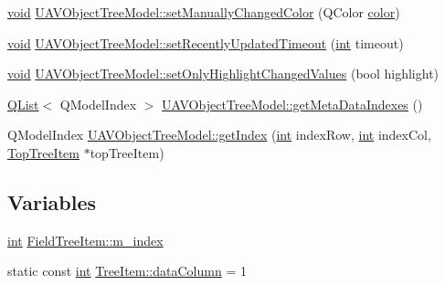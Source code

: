 \begin{DoxyCompactItemize}
\item 
\hyperlink{group___u_a_v_objects_plugin_ga444cf2ff3f0ecbe028adce838d373f5c}{void} \hyperlink{group___u_a_v_object_browser_plugin_ga9bc5e49ee3b742c3f1b9ff05b71f7d7e}{U\-A\-V\-Object\-Tree\-Model\-::set\-Manually\-Changed\-Color} (Q\-Color \hyperlink{glext_8h_a3ea846f998d64f079b86052b6c4193a8}{color})
\item 
\hyperlink{group___u_a_v_objects_plugin_ga444cf2ff3f0ecbe028adce838d373f5c}{void} \hyperlink{group___u_a_v_object_browser_plugin_ga2b730043ef2a9acc337b2a6864894456}{U\-A\-V\-Object\-Tree\-Model\-::set\-Recently\-Updated\-Timeout} (\hyperlink{ioapi_8h_a787fa3cf048117ba7123753c1e74fcd6}{int} timeout)
\item 
\hyperlink{group___u_a_v_objects_plugin_ga444cf2ff3f0ecbe028adce838d373f5c}{void} \hyperlink{group___u_a_v_object_browser_plugin_gaef0cd94aa30b16dabefb791a32542b10}{U\-A\-V\-Object\-Tree\-Model\-::set\-Only\-Highlight\-Changed\-Values} (bool highlight)
\item 
\hyperlink{class_q_list}{Q\-List}$<$ Q\-Model\-Index $>$ \hyperlink{group___u_a_v_object_browser_plugin_ga96556d7a4724a18462706ac54d6cc761}{U\-A\-V\-Object\-Tree\-Model\-::get\-Meta\-Data\-Indexes} ()
\item 
Q\-Model\-Index \hyperlink{group___u_a_v_object_browser_plugin_gaadbcc539338a28f21acc570915b786df}{U\-A\-V\-Object\-Tree\-Model\-::get\-Index} (\hyperlink{ioapi_8h_a787fa3cf048117ba7123753c1e74fcd6}{int} index\-Row, \hyperlink{ioapi_8h_a787fa3cf048117ba7123753c1e74fcd6}{int} index\-Col, \hyperlink{class_top_tree_item}{Top\-Tree\-Item} $\ast$top\-Tree\-Item)
\end{DoxyCompactItemize}
\subsection*{Variables}
\begin{DoxyCompactItemize}
\item 
\hyperlink{ioapi_8h_a787fa3cf048117ba7123753c1e74fcd6}{int} \hyperlink{group___u_a_v_object_browser_plugin_gab2e489418a60e96de39035e776c4e1e6}{Field\-Tree\-Item\-::m\-\_\-index}
\item 
static const \hyperlink{ioapi_8h_a787fa3cf048117ba7123753c1e74fcd6}{int} \hyperlink{group___u_a_v_object_browser_plugin_gad4ee9a1203f812d975a410765ddb8710}{Tree\-Item\-::data\-Column} = 1
\end{DoxyCompactItemize}
